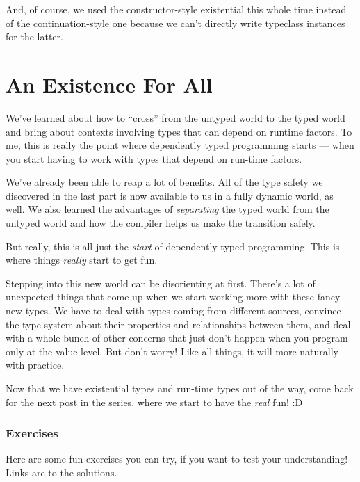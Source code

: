 \documentclass[]{article}
\begin{document}
And, of course, we used the constructor-style existential this whole time
instead of the continuation-style one because we can't directly write typeclass
instances for the latter.

\section{An Existence For All}\label{an-existence-for-all}

We've learned about how to ``cross'' from the untyped world to the typed world
and bring about contexts involving types that can depend on runtime factors. To
me, this is really the point where dependently typed programming starts --- when
you start having to work with types that depend on run-time factors.

We've already been able to reap a lot of benefits. All of the type safety we
discovered in the last part is now available to us in a fully dynamic world, as
well. We also learned the advantages of \emph{separating} the typed world from
the untyped world and how the compiler helps us make the transition safely.

But really, this is all just the \emph{start} of dependently typed programming.
This is where things \emph{really} start to get fun.

Stepping into this new world can be disorienting at first. There's a lot of
unexpected things that come up when we start working more with these fancy new
types. We have to deal with types coming from different sources, convince the
type system about their properties and relationships between them, and deal with
a whole bunch of other concerns that just don't happen when you program only at
the value level. But don't worry! Like all things, it will more naturally with
practice.

Now that we have existential types and run-time types out of the way, come back
for the next post in the series, where we start to have the \emph{real} fun! :D

\subsubsection{Exercises}\label{exercises}

Here are some fun exercises you can try, if you want to test your understanding!
Links are to the solutions.
\end{document}

